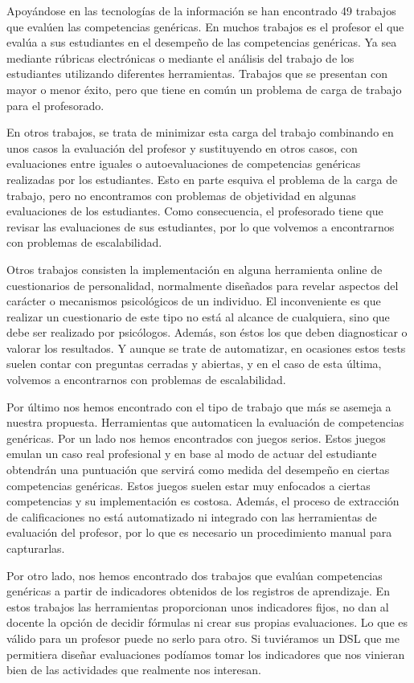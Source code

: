 Apoyándose en las tecnologías de la información se han encontrado 49 trabajos que evalúen las competencias genéricas. En muchos trabajos es el profesor el que evalúa a sus estudiantes en el desempeño de las competencias genéricas. Ya sea mediante rúbricas electrónicas o mediante el análisis del trabajo de los estudiantes utilizando diferentes herramientas. Trabajos que se presentan con mayor o menor éxito, pero que tiene en común un problema de carga de trabajo para el profesorado.

En otros trabajos, se trata de minimizar esta carga del trabajo combinando en unos casos la evaluación del profesor y sustituyendo en otros casos, con evaluaciones entre iguales o autoevaluaciones de competencias genéricas realizadas por los estudiantes. Esto en parte esquiva el problema de la carga de trabajo, pero no encontramos con problemas de objetividad en algunas evaluaciones de los estudiantes. Como consecuencia, el profesorado tiene que revisar las evaluaciones de sus estudiantes, por lo que volvemos a encontrarnos con problemas de escalabilidad.

Otros trabajos consisten la implementación en alguna herramienta online de cuestionarios de personalidad, normalmente diseñados para revelar aspectos del carácter o mecanismos psicológicos de un individuo. El inconveniente es que realizar un cuestionario de este tipo no está al alcance de cualquiera, sino que debe ser realizado por psicólogos. Además, son éstos los que deben diagnosticar o valorar los resultados. Y aunque se trate de automatizar, en ocasiones estos tests suelen contar con preguntas cerradas y abiertas, y en el caso de esta última, volvemos a encontrarnos con problemas de escalabilidad.

Por último nos hemos encontrado con el tipo de trabajo que más se asemeja a nuestra propuesta. Herramientas que automaticen la evaluación de competencias genéricas. Por un lado nos hemos encontrados con juegos serios. Estos juegos emulan un caso real profesional y en base al modo de actuar del estudiante obtendrán una puntuación que servirá como medida del desempeño en ciertas competencias genéricas. Estos juegos suelen estar muy enfocados a ciertas competencias y su implementación es costosa. Además, el proceso de extracción de calificaciones no está automatizado ni integrado con las herramientas de evaluación del profesor, por lo que es necesario un procedimiento manual para capturarlas.

Por otro lado, nos hemos encontrado dos trabajos que evalúan competencias genéricas a partir de indicadores obtenidos de los registros de aprendizaje. En estos trabajos las herramientas proporcionan unos indicadores fijos, no dan al docente la opción de decidir fórmulas ni crear sus propias evaluaciones. Lo que es válido para un profesor puede no serlo para otro. Si tuviéramos un DSL que me permitiera diseñar evaluaciones podíamos tomar los indicadores que nos vinieran bien de las actividades que realmente nos interesan.

\pagestyle{fancy}



